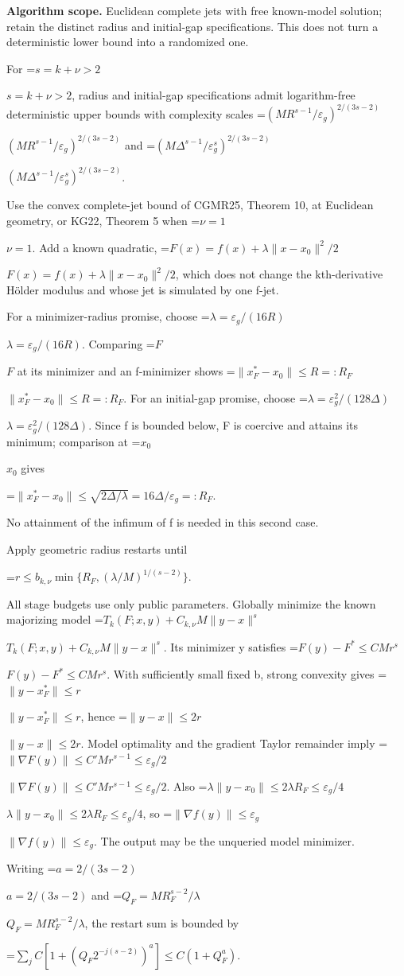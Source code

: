 \documentclass[10pt,a4paper]{article}
\newcommand{\AtlasMath}[1]{\par\begingroup\centering\setbox0=\hbox{$\displaystyle #1$}\ifdim\wd0>1.4\linewidth\typeout{ATLAS WIDE FORMULA: \the\wd0}\fi\ifdim\wd0>\linewidth\resizebox{\linewidth}{!}{\box0}\else\box0\fi\par\endgroup}
\newcommand{\AtlasInlineMath}[1]{\begingroup\setbox0=\hbox{$#1$}\ifdim\wd0>.4\linewidth\endgroup\AtlasMath{#1}\else\endgroup$#1$\fi}
\begin{document}
\textbf{Algorithm scope.} Euclidean complete jets with free known-model solution; retain the distinct radius and initial-gap specifications. This does not turn a deterministic lower bound into a randomized one.

For \AtlasInlineMath{s=k+\nu>2}, radius and initial-gap specifications admit logarithm-free deterministic upper bounds with complexity scales \AtlasInlineMath{(MR^{s-1}/\varepsilon_g)^{2/(3s-2)}} and \AtlasInlineMath{(M\Delta^{s-1}/\varepsilon_g^s)^{2/(3s-2)}}.

Use the convex complete-jet bound of CGMR25, Theorem 10, at Euclidean geometry, or KG22, Theorem 5 when \AtlasInlineMath{\nu=1}. Add a known quadratic, \AtlasInlineMath{F(x)=f(x)+\lambda\|x-x_0\|^2/2}, which does not change the kth-derivative Hölder modulus and whose jet is simulated by one f-jet.

For a minimizer-radius promise, choose \AtlasInlineMath{\lambda=\varepsilon_g/(16R)}. Comparing \AtlasInlineMath{F} at its minimizer and an f-minimizer shows \AtlasInlineMath{\|x_F^*-x_0\|\le R=:R_F}. For an initial-gap promise, choose \AtlasInlineMath{\lambda=\varepsilon_g^2/(128\Delta)}. Since f is bounded below, F is coercive and attains its minimum; comparison at \AtlasInlineMath{x_0} gives

\AtlasMath{\|x_F^*-x_0\|\le\sqrt{2\Delta/\lambda}=16\Delta/\varepsilon_g=:R_F.}

No attainment of the infimum of f is needed in this second case.

Apply geometric radius restarts until

\AtlasMath{r\le b_{k,\nu}\min\{R_F,(\lambda/M)^{1/(s-2)}\}.}

All stage budgets use only public parameters. Globally minimize the known majorizing model \AtlasInlineMath{T_k(F;x,y)+C_{k,\nu}M\|y-x\|^s}. Its minimizer y satisfies \AtlasInlineMath{F(y)-F^*\le CMr^s}. With sufficiently small fixed b, strong convexity gives \AtlasInlineMath{\|y-x_F^*\|\le r}, hence \AtlasInlineMath{\|y-x\|\le2r}. Model optimality and the gradient Taylor remainder imply \AtlasInlineMath{\|\nabla F(y)\|\le C'Mr^{s-1}\le\varepsilon_g/2}. Also \AtlasInlineMath{\lambda\|y-x_0\|\le2\lambda R_F\le\varepsilon_g/4}, so \AtlasInlineMath{\|\nabla f(y)\|\le\varepsilon_g}. The output may be the unqueried model minimizer.

Writing \AtlasInlineMath{a=2/(3s-2)} and \AtlasInlineMath{Q_F=MR_F^{s-2}/\lambda}, the restart sum is bounded by

\AtlasMath{\sum_j C[1+(Q_F2^{-j(s-2)})^a]\le C(1+Q_F^a).}
\end{document}

